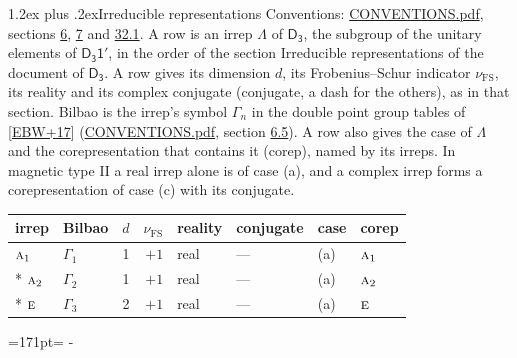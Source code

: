 \documentclass[10pt,a4paper]{article}
\makeatletter
\renewcommand\section{\@startsection{section}{1}{\z@}{-3ex plus -1ex minus -.2ex}%
  {1.2ex plus .2ex}{\normalfont\large\sffamily\bfseries\color{parttitle}}}
\newcommand{\needspace}[1]{\par\penalty-100\begingroup\dimen0=#1\relax\dimen2=\pagegoal
  \advance\dimen2-\pagetotal\ifdim\dimen0>\dimen2\relax\ifdim\dimen2>0pt\vfil\break\fi\fi
  \endgroup}
\numberwithin{equation}{section}
\newcommand{\grp}[1]{\mathsf{#1}}
\newcommand{\irr}[1]{\text{\normalfont\scshape #1}}
\newcommand{\fsind}{\nu_{\mathrm{FS}}}
\makeatother
\begin{document}
\section{Irreducible representations}\label{s:irreps}
Conventions: \href{../../CONVENTIONS.pdf}{CONVENTIONS.pdf}, sections \href{../../../rotation/CONVENTIONS.pdf\#conv.6}{6}, \href{../../../rotation/CONVENTIONS.pdf\#conv.7}{7} and \href{../../CONVENTIONS.pdf\#conv.32.1}{32.1}.
\leavevmode\label{n:irrep.Delta}A row is an irrep $\Lambda$ of $\grp{D_{3}}$, the subgroup of the unitary elements of $\grp{D_{3}1'}$, in the order of the section Irreducible representations of the document of \href{../../../rotation/data/pdf/D3.pdf}{$\grp{D_{3}}$}. \label{n:index.dimension}\label{n:index.frobenius}\label{n:head.irrep}\label{n:head.reality}\label{n:head.conjugate}A row gives its dimension $d$, its Frobenius--Schur indicator $\fsind$, its reality and its complex conjugate (conjugate, a dash for the others), as in that section. \label{n:head.bilbao}\label{n:irrep.alias.gamma}Bilbao is the irrep's symbol $\Gamma_n$ in the double point group tables of [\href{../../../REFERENCES.pdf\#ref.EBW+17}{EBW+17}] (\href{../../CONVENTIONS.pdf}{CONVENTIONS.pdf}, section \href{../../../rotation/CONVENTIONS.pdf\#conv.6.5}{6.5}). \label{n:head.case.corep}\label{n:head.corep}A row also gives the case of $\Lambda$ and the corepresentation that contains it (corep), named by its irreps. In magnetic type II a real irrep alone is of case (a), and a complex irrep forms a corepresentation of case (c) with its conjugate.
\setlength{\emergencystretch}{2em}\par\setlength{\emergencystretch}{0pt}
{\small\renewcommand{\arraystretch}{1.25}\setlength{\tabcolsep}{4pt}\begin{longtable}{@{}llrrllll@{}}\toprule
irrep & Bilbao & $d$ & $\fsind$ & reality & conjugate & case & corep\\\midrule\endhead
\bottomrule\endfoot\endlastfoot
$\irr{a}_{1}$ & $\Gamma_{1}$ & 1 & $+1$ & real & --- & (a) & $\irr{a}_{1}$\\*
$\irr{a}_{2}$ & $\Gamma_{2}$ & 1 & $+1$ & real & --- & (a) & $\irr{a}_{2}$\\*
$\irr{e}$ & $\Gamma_{3}$ & 2 & $+1$ & real & --- & (a) & $\irr{e}$\\
\bottomrule\end{longtable}}
\needspace{171pt}
\end{document}
